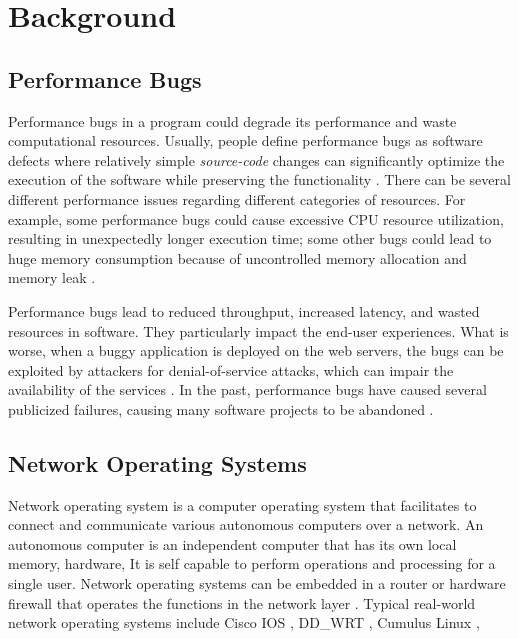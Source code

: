 \section{Background}
\label{s:background}

\subsection{Performance Bugs}
\label{s:background-bug}
Performance bugs in a program could degrade its performance and waste computational resources.
%
Usually, people define performance bugs as software defects where relatively simple \emph{source-code} changes can significantly optimize the execution of the software while preserving the functionality \cite{perfbugstudy, killian2010finding, s2e}.
%
There can be several different performance issues regarding different categories of resources.
%
For example, some performance bugs could cause excessive CPU resource utilization, resulting in unexpectedly longer execution time; 
%
some other bugs could lead to huge memory consumption because of uncontrolled memory allocation and memory leak \cite{wen2020memlock}.
%

Performance bugs lead to reduced throughput, increased latency, and wasted resources in software.
%
They particularly impact the end-user experiences.
%
What is worse, when a buggy application is deployed on the web servers, the bugs can be exploited by attackers for denial-of-service attacks, which can impair the availability of the services \cite{rampart}.
%
In the past, performance bugs have caused several publicized failures, causing many software projects to be abandoned \cite{perfbugstudy, lessons}.

\subsection{Network Operating Systems}
\label{s:background-nos}
Network operating system is a computer operating system that facilitates to connect and communicate various autonomous computers over a network. 
%
An autonomous computer is an independent computer that has its own local memory, hardware, \etc{}
%
It is self capable to perform operations and processing for a single user. 
%
Network operating systems can be embedded in a router or hardware firewall that operates the functions in the network layer \cite{al2001dialoguer}.
%
Typical real-world network operating systems include Cisco IOS \cite{cisco-ios}, DD_WRT \cite{dd-wrt}, Cumulus Linux \cite{cumulus-linux}, \etc{}


